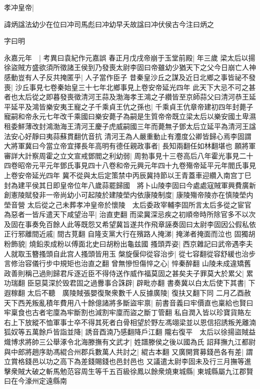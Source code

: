 孝冲皇帝|{
	諱炳諡法幼少在位曰冲司馬彪曰冲幼早夭故諡曰冲伏侯古今注曰炳之

字曰明}


永嘉元年　|{
	考異曰袁紀作元嘉誤}
春正月戊戌帝崩于玉堂前殿|{
	年三歲}
梁太后以揚徐盜賊方盛欲須所徵諸王侯到乃發喪太尉李固曰帝雖幼少猶天下之父今日崩亡人神感動豈有人子反共掩匿乎|{
	人子當作臣子}
昔秦皇沙丘之謀及近日北鄉之事皆祕不發喪|{
	沙丘事見七卷秦始皇三十七年北鄉事見上卷安帝延光四年}
此天下大忌不可之甚者也太后從之即暮發喪徵清河王蒜及渤海孝王鴻之子纘皆至京師蒜父曰清河恭王延平延平及鴻皆樂安夷王寵之子千乘貞王伉之孫也|{
	千乘貞王伉章帝建初四年封薨子寵嗣和帝永元七年改千乘國曰樂安薨子為嗣是生質帝帝既立梁太后以樂安國土卑濕租委鮮薄改封鴻渤海王清河王慶子虎威嗣國三年而薨無子鄧太后立延平為清河王諡法安心好靜曰夷蒜蘇貫翻伉音抗}
清河王為人嚴重動止有灋度公卿皆歸心焉李固謂大將軍冀曰今當立帝宜擇長年高明有德任親政事者|{
	長知兩翻任如林翻堪也}
願將軍審詳大計察周霍之立文宣戒鄧閻之利幼弱|{
	周勃事見十三卷高后八年霍光事見二十四卷昭帝元平元年鄧氏事見四十八卷和帝元興元年四十九卷殤帝延平元年閻氏事見上卷安帝延光四年}
冀不從與太后定策禁中丙辰冀持節以王青蓋車迎纘入南宫丁巳封為建平侯其日即皇帝位年八歲蒜罷歸國　將卜山陵李固曰今處處寇賊軍興費廣新創憲陵賦發非一帝尚幼小可起陵於建陵塋内依康陵制度|{
	康陵殤帝陵亦在慎陵塋内塋音營}
太后從之己未葬孝冲皇帝於懷陵　太后委政宰輔李固所言太后多從之宦官為惡者一皆斥遣天下咸望治平|{
	治直吏翻}
而梁冀深忌疾之初順帝時所除官多不以次及固在事奏免百餘人此等既怨又希望冀旨遂共作飛章誣奏固曰太尉李固因公假私依正行邪離間近戚|{
	間古莧翻}
自隆支黨大行在殯路人掩涕|{
	掩涕者掩面而泣也}
固獨胡粉飾貌|{
	燒鉛汞成粉以傅面北史曰胡粉出龜兹國}
搔頭弄姿|{
	西京雜記曰武帝遇李夫人就取玉簪搔頭自此宫人搔頭皆用玉}
槃旋偃仰從容治步|{
	從七容翻從容舒緩也治步言修治容儀行步中規矩也治直之翻}
曾無慘怛傷悴之心|{
	悴秦醉翻}
山陵未成違矯舊政善則稱己過則歸君斥逐近臣不得侍送作威作福莫固之甚矣夫子罪莫大於累父|{
	累功瑞翻}
臣惡莫深於毁君固之過釁事合誅辟|{
	辟毗亦翻}
書奏冀以白太后使下其書|{
	下遐稼翻}
太后不聽　廣陵賊張嬰復聚衆數千人反據廣陵|{
	復扶又翻下同}
二月乙酉赦天下西羌叛亂積年費用八十餘億諸將多斷盜牢禀|{
	前書音義曰牢價直也稟給也賢曰牢稟食也古者宅廩為牢斷割也減割牢廩而盜之斷丁管翻}
私自潤入皆以珍寶貨賂左右上下放縱不恤軍事士卒不得其死者白骨相望於野左馮翊梁並以恩信招誘叛羌離湳狐奴等五萬餘戶皆詣並降|{
	誘音酉湳乃感翻降戶江翻}
隴右復平　太后以徐揚盜賊益熾博求將帥三公舉涿令北海滕撫有文武才|{
	姓譜滕侯之後以國為氏}
詔拜撫九江都尉與中郎將趙序助馮緄合州郡兵數萬人共討之|{
	緄古本翻}
又廣開賞募錢邑各有差|{
	謂立賞格錢邑以功之高下為差錢賜錢也邑封邑也}
又議遣太尉李固未及行三月撫等進擊衆賊大破之斬馬勉范容周生等千五百級徐鳳以餘衆燒東城縣|{
	東城縣屬九江郡賢曰在今濠州定遠縣南}
